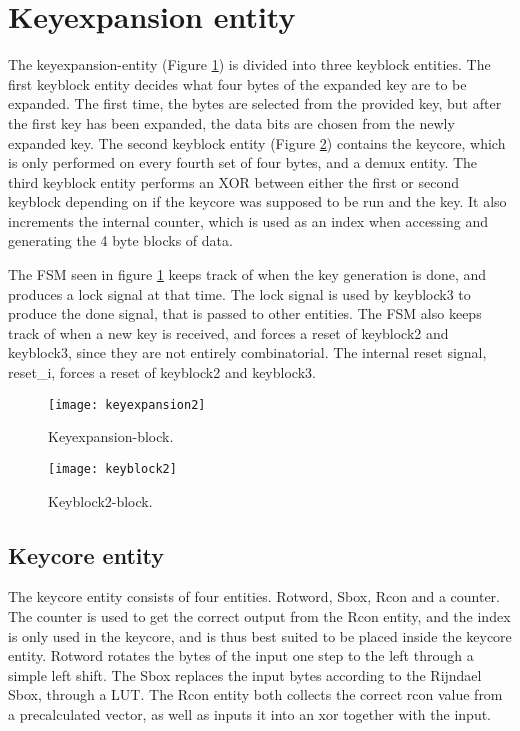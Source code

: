 \section{Keyexpansion entity} \label{sec:Expansion}
The keyexpansion-entity (Figure \ref{block:keyexpansion}) is divided 
into three keyblock entities. The first keyblock entity decides what 
four bytes of the expanded key are to be expanded. The first time, the 
bytes are selected from the provided key, but after the first key has 
been expanded, the data bits are chosen from the newly expanded key. 
The second keyblock entity (Figure \ref{block:keyblock2}) contains the 
keycore, which is only performed on every fourth set of four bytes, 
and a demux entity. The third keyblock entity performs an XOR between 
either the first or second keyblock depending on if the keycore was 
supposed to be run and the key. It also increments the internal 
counter, which is used as an index when accessing and generating the 4 
byte blocks of data.

The FSM seen in figure \ref{block:keyexpansion} keeps track of when 
the key generation is done, and produces a lock signal at that time. 
The lock signal is used by keyblock3 to produce the done signal, that 
is passed to other entities. 
The FSM also keeps track of when a new key is received, and forces a 
reset of keyblock2 and keyblock3, since they are not entirely 
combinatorial. The internal reset signal, reset\_i, forces a reset of 
keyblock2 and keyblock3. 

\begin{figure}[h!]
  \centering
  \texttt{[image: keyexpansion2]}
  \caption{Keyexpansion-block.}
  \label{block:keyexpansion}
\end{figure}

\begin{figure}[h!]
  \centering
  \texttt{[image: keyblock2]}
  \caption{Keyblock2-block.}
  \label{block:keyblock2}
\end{figure}

\subsection{Keycore entity}
The keycore entity consists of four entities. Rotword, Sbox, Rcon and 
a counter. The counter is used to get the correct output from the Rcon 
entity, and the index is only used in the keycore, and is thus best 
suited to be placed inside the keycore entity. Rotword rotates the 
bytes of the input one step to the left through a simple left shift. 
The Sbox replaces the input bytes according to the Rijndael Sbox, 
through a LUT. The Rcon entity both collects the correct rcon value 
from a precalculated vector, as well as inputs it into an xor together 
with the input.

